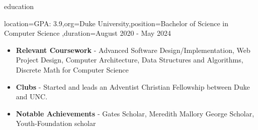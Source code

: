 \documentclass{resume}
\begin{document}
\makeheader

\newcommand{\skill}[2]{\textbf{#1} - #2}

\begin{ResumeSection}{education}
    \begin{ResumeSubsection}{location={GPA: 3.9},org={Duke University},position={Bachelor of Science in Computer Science}
        ,duration={August 2020 - May 2024}}
        \begin{itemize}
            \item \skill{Relevant Coursework}{Advanced Software Design/Implementation, Web Project Design, Computer Architecture,
                Data Structures and Algorithms, Discrete Math for Computer Science}
            \item \skill{Clubs}{Started and leads an Adventist Christian Fellowship between Duke and UNC.}
            \item \skill{Notable Achievements}{Gates Scholar, Meredith Mallory
                George Scholar, Youth-Foundation scholar}
        \end{itemize}
    \end{ResumeSubsection}
\end{ResumeSection}
\end{document}
